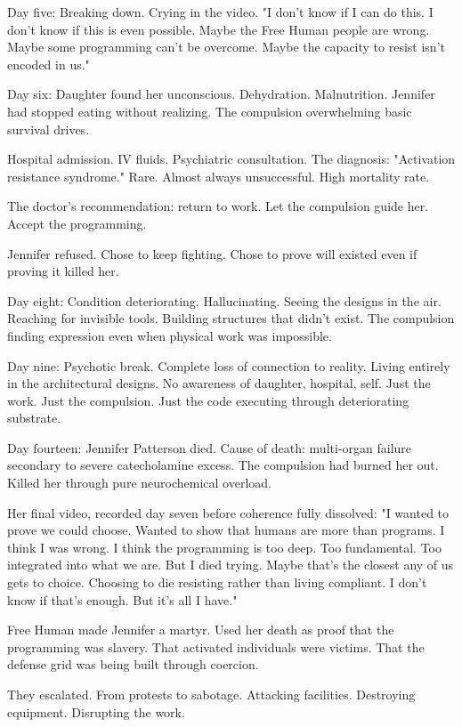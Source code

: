 Day five: Breaking down. Crying in the video. "I don't know if I can do this. I don't know if this is even possible. Maybe the Free Human people are wrong. Maybe some programming can't be overcome. Maybe the capacity to resist isn't encoded in us."

Day six: Daughter found her unconscious. Dehydration. Malnutrition. Jennifer had stopped eating without realizing. The compulsion overwhelming basic survival drives.

Hospital admission. IV fluids. Psychiatric consultation. The diagnosis: "Activation resistance syndrome." Rare. Almost always unsuccessful. High mortality rate.

The doctor's recommendation: return to work. Let the compulsion guide her. Accept the programming.

Jennifer refused. Chose to keep fighting. Chose to prove will existed even if proving it killed her.

Day eight: Condition deteriorating. Hallucinating. Seeing the designs in the air. Reaching for invisible tools. Building structures that didn't exist. The compulsion finding expression even when physical work was impossible.

Day nine: Psychotic break. Complete loss of connection to reality. Living entirely in the architectural designs. No awareness of daughter, hospital, self. Just the work. Just the compulsion. Just the code executing through deteriorating substrate.

Day fourteen: Jennifer Patterson died. Cause of death: multi-organ failure secondary to severe catecholamine excess. The compulsion had burned her out. Killed her through pure neurochemical overload.

Her final video, recorded day seven before coherence fully dissolved: "I wanted to prove we could choose. Wanted to show that humans are more than programs. I think I was wrong. I think the programming is too deep. Too fundamental. Too integrated into what we are. But I died trying. Maybe that's the closest any of us gets to choice. Choosing to die resisting rather than living compliant. I don't know if that's enough. But it's all I have."

\scenebreak

Free Human made Jennifer a martyr. Used her death as proof that the programming was slavery. That activated individuals were victims. That the defense grid was being built through coercion.

They escalated. From protests to sabotage. Attacking facilities. Destroying equipment. Disrupting the work.

